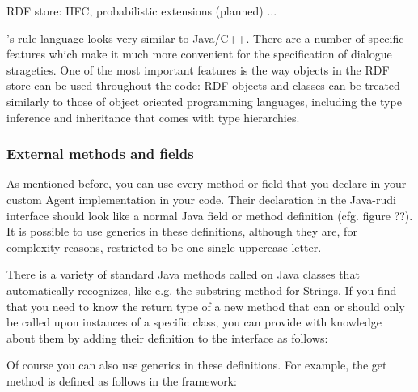 RDF store: HFC, probabilistic extensions (planned) ...
\fi

\vonda's rule language looks very similar to Java/C++. There are a number of
specific features which make it much more convenient for the specification of
dialogue strageties. One of the most important features is the way objects in
the RDF store can be used throughout the code: RDF objects and classes can be
treated similarly to those of object oriented programming languages, including
the type inference and inheritance that comes with type hierarchies.


\subsubsection{External methods and fields}
\label{sec:rudimant-global}

As mentioned before, you can use every method or field that you declare in your custom Agent implementation in your \vonda code. Their declaration in the Java-rudi interface should look like a normal Java field or method definition (cfg. figure ??). It is possible to use generics in these definitions, although they are, for complexity reasons, restricted to be one single uppercase letter.


There is a variety of standard Java methods called on Java classes that \vonda automatically recognizes, like e.g. the substring method for Strings. If you find that you need \vonda to know the return type of a new method that can or should only be called upon instances of a specific class, you can provide \vonda with knowledge about them by adding their definition to the interface as follows:


Of course you can also use generics in these definitions. For example, the get method is defined as follows in the \vonda framework:


%

